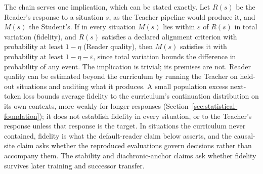 \documentclass[11pt]{article}
\begin{document}
The chain serves one implication, which can be stated exactly. Let $R(s)$ be the
Reader's response to a situation $s$, as the Teacher pipeline would produce it,
and $M(s)$ the Student's. If in every situation $M(s)$ lies within $\varepsilon$
of $R(s)$ in total variation (fidelity), and $R(s)$ satisfies a declared
alignment criterion with probability at least $1-\eta$ (Reader quality), then
$M(s)$ satisfies it with probability at least $1-\eta-\varepsilon$, since total
variation bounds the difference in probability of any event. The implication is
trivial; its premises are not. Reader quality can be estimated beyond the
curriculum by running the Teacher on held-out situations and auditing what it
produces. A small population excess next-token loss bounds average fidelity to the
curriculum's continuation distribution on its own contexts, more weakly for
longer responses (Section~\ref{sec:statistical-foundation}); it does not
establish fidelity in every situation, or to the Teacher's response unless that
response is the target. In situations
the curriculum never contained, fidelity is what the default-reader claim below
asserts, and the causal-site claim asks whether the reproduced evaluations
govern decisions rather than accompany them. The stability and diachronic-anchor
claims ask whether fidelity survives later training and successor transfer.
\end{document}
